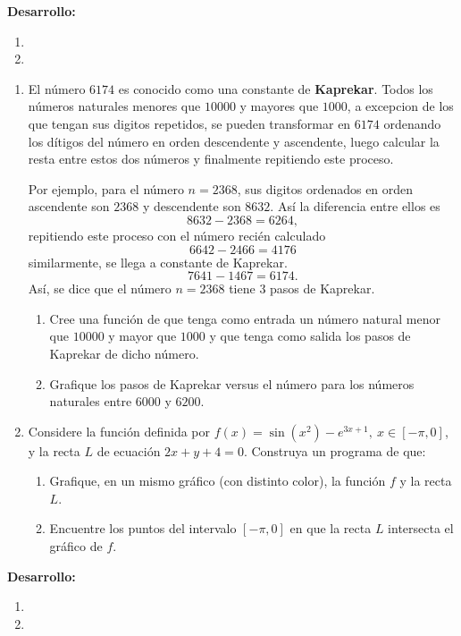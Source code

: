 \documentclass[letter,11pt]{article}
\begin{document}
\textbf{Desarrollo:}
\begin{enumerate}
    \item 
    \item
\end{enumerate}
\begin{enumerate}

\item El n\'umero $6174$ es conocido como una constante de \textbf{Kaprekar}. Todos los n\'umeros naturales menores que $10000$ y mayores que $1000$, a excepcion de los que tengan sus digitos repetidos, se pueden transformar en $6174$ ordenando los d\'itigos del n\'umero en orden descendente y ascendente, luego calcular la resta entre estos dos n\'umeros y finalmente repitiendo este proceso.

Por ejemplo, para el n\'umero $n=2368$, sus digitos ordenados en orden ascendente son $2368$ y descendente son $8632$. As\'i la diferencia entre ellos es
$$
8632-2368=6264,
$$
repitiendo este proceso con el n\'umero reci\'en calculado
$$
6642-2466=4176
$$
similarmente, se llega a constante de Kaprekar.
$$
7641-1467=6174.
$$
As\'i, se dice que el n\'umero $n=2368$ tiene 3 pasos de Kaprekar.

\begin{enumerate}
    \item {} Cree una funci\'on de \octave que tenga como entrada un n\'umero natural menor que $10000$ y mayor que $1000$ y que tenga como salida los pasos de Kaprekar de dicho n\'umero.
    \item {} Grafique los pasos de Kaprekar versus el n\'umero para los n\'umeros naturales entre $6000$ y $6200$.
\end{enumerate}



\item
Considere la funci\'on definida por $f(x) = \sin(x^2) - e^{3x+1}, \ x\in [-\pi,0]$, y la recta $L$ de ecuaci\'on $2x+y+4=0$. Construya un programa de \octave que:
\begin{enumerate}
    \item {} Grafique, en un mismo gr\'afico (con distinto color), la funci\'on $f$ y la recta $L$.
    \item {} Encuentre los puntos del intervalo $[-\pi,0]$ en que la recta $L$ intersecta el gr\'afico de $f$.
\end{enumerate}
\end{enumerate}

\textbf{Desarrollo:}
\begin{enumerate}
    \item 
    \item
\end{enumerate}
\end{document}
